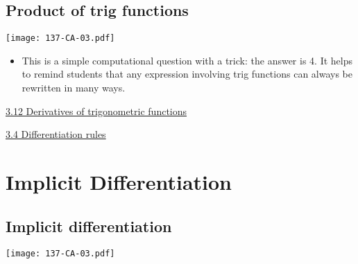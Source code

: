 \documentclass[11pt]{article}
\newcommand{\nl}{\hfill \vspace{-1.1\baselineskip}} %
\newcommand{\viv}{\hspace{8mm} \href{https://www.youtube.com/watch?v=k_VxtK1U9jk&list=PLlwePzQY_wW8qiZD6XYqCnibdY37ygbx7&index=4}{3.4 Differentiation rules}}
\newcommand{\vxii}{\hspace{8mm} \href{https://www.youtube.com/watch?v=E_Cvb53vXI0&list=PLlwePzQY_wW8qiZD6XYqCnibdY37ygbx7&index=12}{3.12 Derivatives of trigonometric functions}}
\begin{document}
\newpage


\subsection{Product of trig functions} 

\begin{center}
{ \texttt{[image: 137-CA-03.pdf]}} 

\end{center}


\begin{comments}
\nl
	\begin{itemize}
		\item This is a simple computational question with a trick: the answer is 4.  It helps to remind students that any expression involving trig functions can always be rewritten in many ways.	
	\end{itemize}
\end{comments}

\begin{videos}
\vxii

\viv
\end{videos}

\newpage


\section{Implicit Differentiation}

\subsection{Implicit differentiation} 

\begin{center}
{ \texttt{[image: 137-CA-03.pdf]}} 
\end{center}
\end{document}
